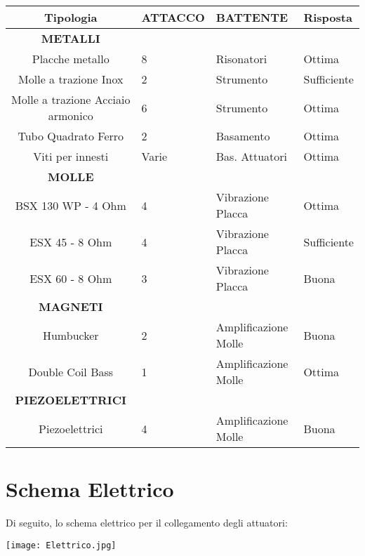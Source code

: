 \begin{tabular}{cp{2cm}p{2cm}p{2cm}} \textbf{Tipologia}&\textbf{ATTACCO}&\textbf{BATTENTE}&\textbf{Risposta}\\
\hline \textbf{METALLI}\\
\hline Placche metallo&8&Risonatori&Ottima\\
\hline Molle a trazione Inox&2&Strumento&Sufficiente\\
\hline Molle a trazione Acciaio armonico&6&Strumento&Ottima\\
\hline Tubo Quadrato Ferro&2&Basamento&Ottima\\
\hline Viti per innesti&Varie&Bas. Attuatori&Ottima\\
\hline \textbf{MOLLE}\\
\hline BSX 130 WP - 4 Ohm&4&Vibrazione Placca&Ottima\\
\hline ESX 45 - 8 Ohm&4&Vibrazione Placca&Sufficiente\\
\hline ESX 60 - 8 Ohm&3&Vibrazione Placca&Buona\\
\hline \textbf{MAGNETI}\\
\hline Humbucker&2&Amplificazione Molle&Buona\\
\hline Double Coil Bass&1&Amplificazione Molle&Ottima\\
\hline \textbf{PIEZOELETTRICI} \\
\hline Piezoelettrici&4&Amplificazione Molle&Buona\\
\hline
\end{tabular}
\section{Schema Elettrico}
Di seguito, lo schema elettrico per il collegamento degli attuatori:
\begin{center}
\texttt{[image: Elettrico.jpg]}
\end{center}
